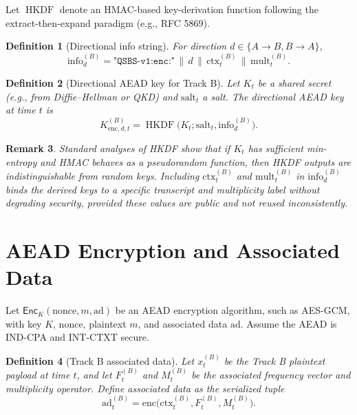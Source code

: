 \documentclass[11pt]{article}
\newtheorem{definition}{Definition}[section]
\newtheorem{remark}[definition]{Remark}
\newcommand{\Enc}{\mathsf{Enc}}
\DeclareMathOperator{\HKDF}{HKDF}
\begin{document}
Let \(\HKDF\) denote an HMAC-based key-derivation function following the extract-then-expand paradigm (e.g., RFC 5869).\cite{HKDFWiki,HKDFDotNet,GopherHKDF}

\begin{definition}[Directional info string]
For direction \(d \in \{A \to B, B \to A\}\),
\[
  \mathrm{info}_d^{(B)} =
    \texttt{"QSBS-v1:enc:"} \,\|\, d \,\|\, \mathrm{ctx}_t^{(B)} \,\|\, \mathrm{mult}_t^{(B)}.
\]
\end{definition}

\begin{definition}[Directional AEAD key for Track B]
Let \(K_t\) be a shared secret (e.g., from Diffie–Hellman or QKD) and \(\mathrm{salt}_t\) a salt.
The directional AEAD key at time \(t\) is
\[
  K_{\mathrm{enc},d,t}^{(B)} = \HKDF\bigl(K_t; \mathrm{salt}_t, \mathrm{info}_d^{(B)}\bigr).
\]
\end{definition}

\begin{remark}
Standard analyses of HKDF show that if \(K_t\) has sufficient min-entropy and HMAC behaves as a pseudorandom function, then HKDF outputs are indistinguishable from random keys.\cite{HKDFWiki,HKDFDotNet,GopherHKDF}
Including \(\mathrm{ctx}_t^{(B)}\) and \(\mathrm{mult}_t^{(B)}\) in \(\mathrm{info}_d^{(B)}\) binds the derived keys to a specific transcript and multiplicity label without degrading security, provided these values are public and not reused inconsistently.
\end{remark}

\section{AEAD Encryption and Associated Data}

Let \(\Enc_K(\mathrm{nonce}, m, \mathrm{ad})\) be an AEAD encryption algorithm, such as AES-GCM, with key \(K\), nonce, plaintext \(m\), and associated data \(\mathrm{ad}\).
Assume the AEAD is IND-CPA and INT-CTXT secure.

\begin{definition}[Track B associated data]
Let \(x_t^{(B)}\) be the Track B plaintext payload at time \(t\), and let \(F_t^{(B)}\) and \(M_t^{(B)}\) be the associated frequency vector and multiplicity operator.
Define associated data as the serialized tuple
\[
  \mathrm{ad}_t^{(B)} = \mathrm{enc}\bigl(\mathrm{ctx}_t^{(B)}, F_t^{(B)}, M_t^{(B)}\bigr).
\]
\end{definition}
\end{document}
